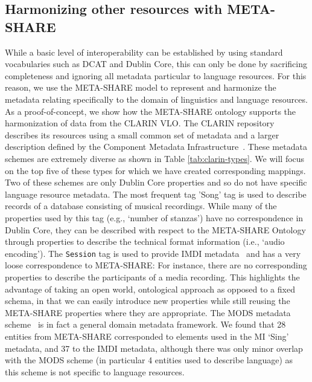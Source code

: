 \documentclass{llncs}
\begin{document}
\subsection{Harmonizing other resources with META-SHARE}
\label{sec:harmonization}
While a basic level of interoperability can be established by using standard
vocabularies such as DCAT and Dublin Core, this can only be done by sacrificing
completeness and ignoring all metadata particular to language resources. For
this reason, we use the META-SHARE model to represent and harmonize the metadata
relating specifically to the domain of linguistics and language resources. As a
proof-of-concept, we show how the META-SHARE ontology supports the harmonization
of data from the CLARIN VLO. The
CLARIN repository describes its resources using a small common set of metadata
and a larger description defined by the Component Metadata
Infrastructure~\cite[CMDI]{broeder2012cmdi}. These metadata schemes are
extremely diverse as shown in Table \ref{tab:clarin-types}.
We will focus on the
top five of these types for which we have created corresponding mappings. Two of these schemes are only Dublin Core properties and so do not have
specific language resource metadata. The most frequent tag 'Song' tag is used to describe records of a 
database consisting of musical recordings. While many of the properties used by this tag (e.g., `number of
stanzas') have no correspondence in Dublin Core, they can be described with respect to the META-SHARE Ontology through properties to describe 
the technical format information (i.e., `audio
encoding'). The {\tt Session} tag is used to provide IMDI metadata~\cite{broeder2001imdi} and has a very loose correspondence to META-SHARE: For instance, there are no corresponding properties to describe the participants of a media recording.
This highlights the advantage of
taking an open world, ontological approach as opposed to a fixed schema, in that
we can easily introduce new properties while still reusing the META-SHARE properties
where they are appropriate.
The MODS metadata
scheme~\cite{gartner2003mods} is in fact a general domain metadata framework.
We found that 28 entities from META-SHARE
corresponded to elements used in the MI `Sing' metadata, and 37 to the IMDI metadata,
although there was only minor overlap with the MODS scheme (in particular 4
entities used to describe language) as this scheme is not specific to language
resources.
\end{document}
